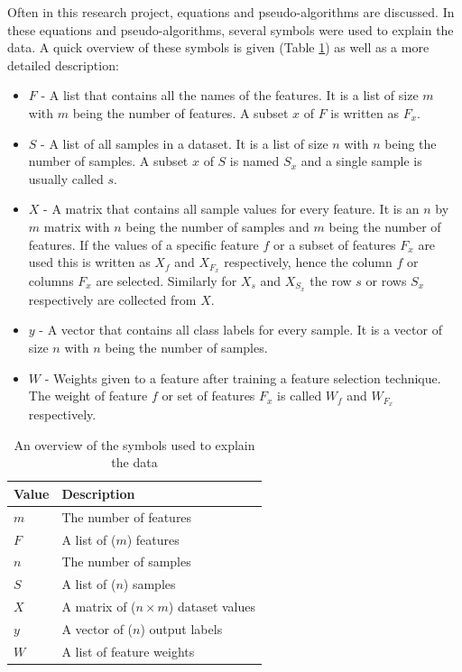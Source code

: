 \documentclass[10pt,a4paper]{report}
\begin{document}
	Often in this research project, equations and pseudo-algorithms are discussed. In these equations and pseudo-algorithms, several symbols were used to explain the data. A quick overview of these symbols is given (Table \ref{tab:DatasetSymbols}) as well as a more detailed description:
	
	\begin{itemize}
		\item \textit{$F$} -
		A list that contains all the names of the features. It is a list of size $m$ with $m$ being the number of features. A subset $x$ of $F$ is written as $F_x$.
		\item \textit{$S$} -  
		A list of all samples in a dataset. It is a list of size $n$ with $n$ being the number of samples. A subset $x$ of $S$ is named $S_x$ and a single sample is usually called $s$. 
		\item \textit{$X$} -
		A matrix that contains all sample values for every feature. It is an $n$ by $m$ matrix with $n$ being the number of samples and $m$ being the number of features. If the values of a specific feature $f$ or a subset of features $F_x$ are used this is written as $X_f$ and $X_{F_x}$ respectively, hence the column $f$ or columns $F_x$ are selected. Similarly for $X_s$ and $X_{S_x}$ the row $s$ or rows $S_x$ respectively are collected from $X$.
		\item \textit{$y$} -
		A vector that contains all class labels for every sample. It is a vector of size $n$ with $n$ being the number of samples.
		\item \textit{$W$} - 
		Weights given to a feature after training a feature selection technique. The weight of feature $f$ or set of features $F_x$ is called $W_f$ and $W_{F_x}$ respectively.
	\end{itemize}
	
	\begin{table}[]
		\caption{An overview of the symbols used to explain the data}
		\label{tab:DatasetSymbols}
		\begin{tabular}{|l|l|}
			\hline
			\textbf{Value} & \textbf{Description}                                   \\ \hline
			$m$				 & The number of features                                 \\ \hline
			$F$              & A list of ($m$) features                                 \\ \hline
			$n$				 & The number of samples                                 \\ \hline
			$S$              & A list of ($n$) samples                                  \\ \hline
			$X$              & A matrix of ($n \times m$) dataset values \\ \hline
			$y$              & A vector of ($n$) output labels                          \\ \hline
			$W$              & A list of feature weights                              \\ \hline
		\end{tabular}
	\end{table}
	
\end{document}
